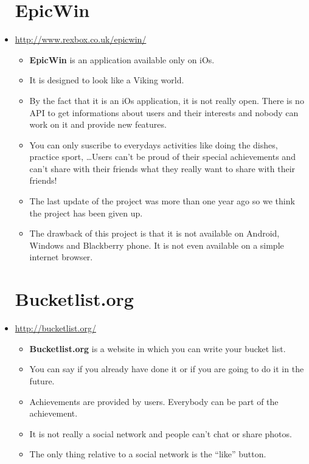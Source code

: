 \documentclass{life-en}
\begin{document}
\begin{itemize}

  \section{EpicWin}

  \item \url{http://www.rexbox.co.uk/epicwin/}\\
    \begin{itemize}
      \item\textbf{EpicWin} is an application available only on iOs.
      \item It is designed to look like a Viking world.
      \item By the fact that it is an iOs application, it is not really open. There is no API to get informations about users and their interests and nobody can work on it and provide new features.
      \item You can only suscribe to everydays activities like doing the dishes, practice sport, \dots Users can’t be proud of their special achievements and can’t share with their friends what they really want to share with their friends!
      \item The last update of the project was more than one year ago so we think the project has been given up.
      \item The drawback of this project is that it is not available on Android, Windows and Blackberry phone. It is not even available on a simple internet browser.
    \end{itemize}

    \section{Bucketlist.org}

    \item \url{http://bucketlist.org/}\\
      \begin{itemize}
        \item \textbf{Bucketlist.org} is a website in which you can write your bucket list.
        \item You can say if you already have done it or if you are going to do it in the future.
        \item Achievements are provided by users. Everybody can be part of the achievement.
        \item It is not really a social network and people can’t chat or share photos.
        \item The only thing relative to a social network is the “like” button.
      \end{itemize}


\end{itemize}
\end{document}
